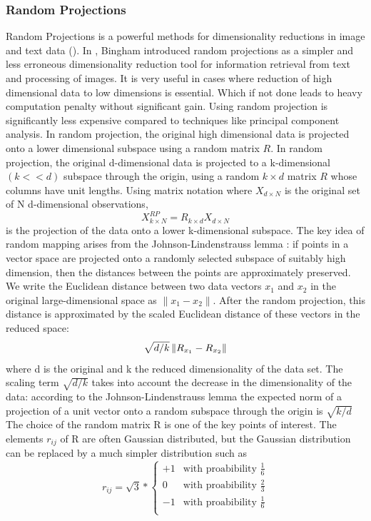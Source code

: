 \subsubsection{Random Projections}
Random Projections is a powerful methods for dimensionality 
reductions in image and text data (\citet*{randproj}).  
In \citet*{rpCite}, Bingham introduced random projections as a 
simpler and less erroneous dimensionality reduction tool for 
information retrieval from text and processing of images. It is 
very useful in cases where reduction of high 
dimensional data to low dimensions is essential. Which if not done
leads to heavy computation penalty without significant gain. 
Using random projection is significantly less expensive compared to 
techniques like principal component analysis. In random projection, 
the original high dimensional data is projected onto a lower 
dimensional subspace using a random matrix $R$. 
In random projection, the original d-dimensional data is projected 
to a k-dimensional $(k << d)$ subspace through the origin, using a 
random $k \times d$ matrix $R$ whose columns have unit lengths. 
Using matrix notation where $X_{d\times N} $ is the original set of 
N d-dimensional observations,
$$ X^{RP}_{k\times N} = R_{k\times d} X_{d\times N} $$
is the projection of the data onto a lower k-dimensional subspace. 
The key idea of random mapping arises from the Johnson-Lindenstrauss 
lemma \citep{lemma}: if points in a vector space are projected onto a 
randomly selected subspace of suitably high dimension, then the 
distances between the points are approximately preserved.   
We write the Euclidean distance between two data vectors $x_1$ and 
$x_2$ in the original large-dimensional space as 
$\lVert x_1 - x_2 \rVert$. After the random projection, this 
distance is approximated by the scaled Euclidean distance of these 
vectors in the reduced space:
$$\sqrt{ d/k} \left\lVert R_{x_1} - R_{x_2} \right\rVert$$
where d is the original and k the reduced dimensionality of the data 
set. The scaling term $\sqrt{d/k}$ takes into account the decrease 
in the dimensionality of the data: according to the 
Johnson-Lindenstrauss lemma \citep{lemma} the expected norm of a projection 
of a unit vector onto a random subspace through the origin is $\sqrt{k/d}$
The choice of the random matrix R is one of the key points of 
interest. The elements $r_{ij}$ of R are often Gaussian distributed,
but the Gaussian distribution can be replaced by a much simpler 
distribution such as
\[
	r_{ij} = \sqrt{3}*\begin{cases} 
	 +1 & \textrm{with proabibility $\frac{1}{6}$} \\
	 0 & \textrm{with proabibility $\frac{2}{3}$}\\
	-1 & \textrm{with proabibility $\frac{1}{6}$} \\
		\end{cases}
\]
